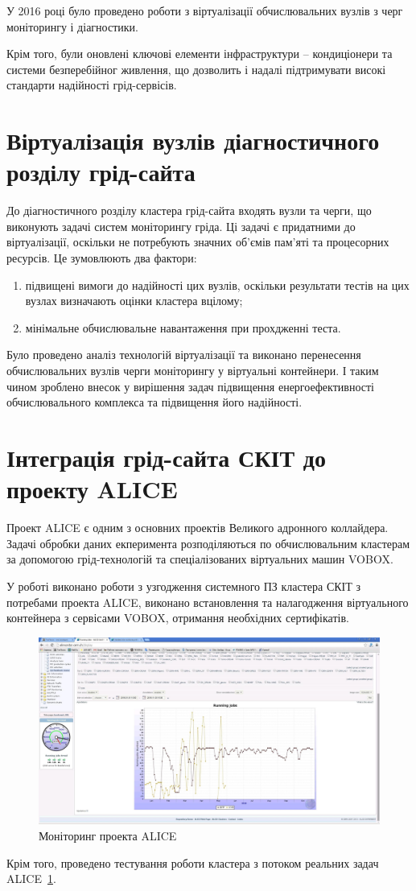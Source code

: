 У 2016 році було проведено роботи з віртуалізації обчислювальних вузлів з черг моніторингу і діагностики.

Крім того, були оновлені ключові елементи інфраструктури -- кондиціонери та системи безперебійног живлення, що дозволить і надалі підтримувати високі стандарти надійності грід-сервісів.


\section{Віртуалізація вузлів діагностичного розділу грід-сайта}

До діагностичного розділу кластера грід-сайта входять вузли та черги, що виконують задачі систем моніторингу гріда. Ці задачі є придатними до віртуалізації, оскільки не потребують значних об'ємів пам'яті та процесорних ресурсів.  Це зумовлюють два фактори: 
\begin{enumerate}
\item підвищені вимоги до надійності цих вузлів, оскільки результати тестів на цих вузлах визначають оцінки кластера вцілому;
\item мінімальне обчислювальне навантаження при прохдженні теста.
\end{enumerate}

Було проведено аналіз технологій віртуалізації та виконано перенесення обчислювальних вузлів черги моніторингу у віртуальні контейнери. І таким чином зроблено внесок у вирішення задач підвищення енергоефективності обчислювального комплекса та підвищення його надійності.


\section{Інтеграція грід-сайта СКІТ до проекту ALICE}

Проект ALICE є одним з основних проектів Великого адронного коллайдера. Задачі обробки даних екперимента розподіляються по обчислювальним кластерам за допомогою грід-технологій та спеціалізованих віртуальних машин VOBOX. 

У роботі виконано роботи з узгодження системного ПЗ кластера СКІТ з потребами проекта ALICE, виконано встановлення та налагодження віртуального контейнера з сервісами VOBOX, отримання необхідних сертифікатів.

\begin{figure}
 \centering
 \includegraphics[width=14cm]{report/Illustrations/alice-stats.jpg} 
 \caption{Моніторинг проекта ALICE}
 \label{fig:alicemon}
\end{figure}

Крім того, проведено тестування роботи кластера з потоком реальних задач ALICE~\ref{fig:alicemon}.
